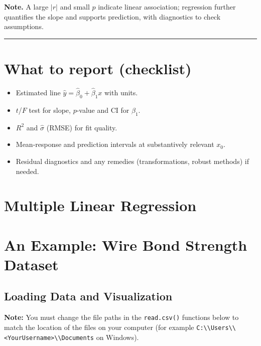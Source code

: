 \documentclass[
  letterpaper,
]{scrbook}
\providecommand{\tightlist}{%
  \setlength{\itemsep}{0pt}\setlength{\parskip}{0pt}}\usepackage{longtable,booktabs,array}
\begin{document}
\textbf{Note.} A large \(|r|\) and small \(p\) indicate linear
association; regression further quantifies the slope and supports
prediction, with diagnostics to check assumptions.

\begin{center}\rule{0.5\linewidth}{0.5pt}\end{center}

\section{What to report (checklist)}\label{what-to-report-checklist}

\begin{itemize}
\tightlist
\item
  Estimated line \(\hat y=\hat\beta_0+\hat\beta_1 x\) with units.
\item
  \(t\)/\(F\) test for slope, \(p\)-value and CI for \(\beta_1\).
\item
  \(R^2\) and \(\hat\sigma\) (RMSE) for fit quality.
\item
  Mean-response and prediction intervals at substantively relevant
  \(x_0\).
\item
  Residual diagnostics and any remedies (transformations, robust
  methods) if needed.
\end{itemize}

\section{Multiple Linear Regression}\label{multiple-linear-regression}

\section{An Example: Wire Bond Strength
Dataset}\label{an-example-wire-bond-strength-dataset}

\subsection{Loading Data and
Visualization}\label{loading-data-and-visualization}

\textbf{Note:} You must change the file paths in the \texttt{read.csv()}
functions below to match the location of the files on your computer (for
example
\texttt{C:\textbackslash{}\textbackslash{}Users\textbackslash{}\textbackslash{}\textless{}YourUsername\textgreater{}\textbackslash{}\textbackslash{}Documents}
on Windows).
\end{document}
